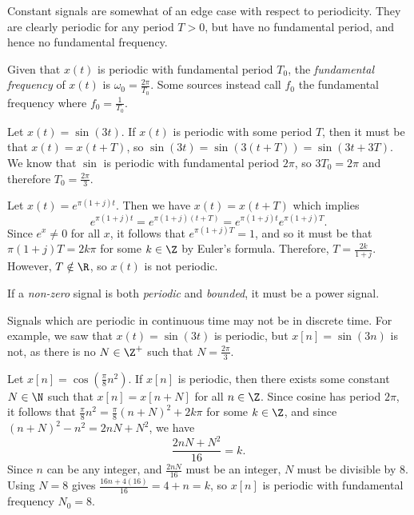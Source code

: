 \documentclass[12pt]{article}
\begin{document}
\begin{rmk}
    Constant signals are somewhat of an edge case with respect to periodicity. They are clearly periodic for any period $T > 0$, but have no fundamental period, and hence no fundamental frequency.
\end{rmk}

\begin{defn}
    Given that $x(t)$ is periodic with fundamental period $T_0$, the \emph{fundamental frequency} of $x(t)$ is $\omega_0 = \frac{2\pi}{T_0}$. Some sources instead call $f_0$ the fundamental frequency where $f_0 = \frac{1}{T_0}$.
\end{defn}

\begin{exmp}
    Let $x(t) = \sin(3t)$. If $x(t)$ is periodic with some period $T$, then it must be that $x(t) = x(t + T)$, so $\sin(3t) = \sin(3(t + T)) = \sin(3t + 3T)$. We know that $\sin$ is periodic with fundamental period $2\pi$, so $3T_0 = 2\pi$ and therefore $T_0 = \frac{2\pi}{3}$.
\end{exmp}

\begin{exmp}
    Let $x(t) = e^{\pi(1 + j)t}$. Then we have $x(t) = x(t + T)$ which implies \[e^{\pi(1 + j)t} = e^{\pi(1 + j)(t + T)} = e^{\pi(1 + j)t}e^{\pi(1 + j)T}.\] Since $e^x \neq 0$ for all $x$, it follows that $e^{\pi(1 + j)T} = 1$, and so it must be that $\pi(1 + j)T = 2k{\pi}$ for some $k \in \Z$ by Euler's formula. Therefore, $T = \frac{2k}{1 + j}$. However, $T \notin \R$, so $x(t)$ is not periodic.
\end{exmp}

\begin{rmk}
    If a \emph{non-zero} signal is both \emph{periodic} and \emph{bounded}, it must be a power signal.
\end{rmk}

\begin{rmk}
    Signals which are periodic in continuous time may not be in discrete time. For example, we saw that $x(t) = \sin(3t)$ is periodic, but $x[n] = \sin(3n)$ is not, as there is no $N \in \Z^+$ such that $N = \frac{2\pi}{3}$.
\end{rmk}

\begin{exmp}
    Let $x[n] = \cos(\frac{\pi}{8}n^2)$. If $x[n]$ is periodic, then there exists some constant $N \in \N$ such that $x[n] = x[n+N]$ for all $n \in \Z$. Since cosine has period $2\pi$, it follows that
    $\frac{\pi}{8}n^2 = \frac{\pi}{8}(n+N)^2 + 2k\pi$ for some $k \in \Z$, and since $(n+N)^2 - n^2 = 2nN + N^2$, we have \[\frac{2nN+N^2}{16} = k.\] Since $n$ can be any integer, and $\frac{2nN}{16}$ must be an integer, $N$ must be divisible by $8$. Using $N = 8$ gives $\frac{16n + 4(16)}{16} = 4 + n = k$, so $x[n]$ is periodic with fundamental frequency $N_0 = 8$.
\end{exmp}
\end{document}
